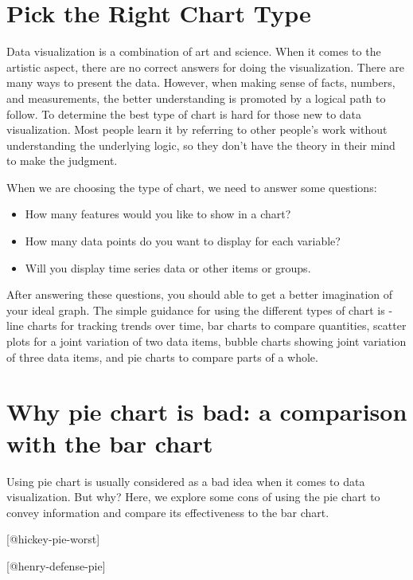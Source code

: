 \documentclass[]{book}
\providecommand{\tightlist}{%
  \setlength{\itemsep}{0pt}\setlength{\parskip}{0pt}}
\theoremstyle{definition}
\theoremstyle{definition}
\theoremstyle{definition}
\theoremstyle{remark}
\begin{document}
\section{Pick the Right Chart Type}\label{pick-the-right-chart-type}

Data visualization is a combination of art and science. When it comes to
the artistic aspect, there are no correct answers for doing the
visualization. There are many ways to present the data. However, when
making sense of facts, numbers, and measurements, the better
understanding is promoted by a logical path to follow. To determine the
best type of chart is hard for those new to data visualization. Most
people learn it by referring to other people's work without
understanding the underlying logic, so they don't have the theory in
their mind to make the judgment.

When we are choosing the type of chart, we need to answer some
questions:

\begin{itemize}
\tightlist
\item
  How many features would you like to show in a chart?
\item
  How many data points do you want to display for each variable?
\item
  Will you display time series data or other items or groups.
\end{itemize}

After answering these questions, you should able to get a better
imagination of your ideal graph. The simple guidance for using the
different types of chart is - line charts for tracking trends over time,
bar charts to compare quantities, scatter plots for a joint variation of
two data items, bubble charts showing joint variation of three data
items, and pie charts to compare parts of a whole.

\section{Why pie chart is bad: a comparison with the bar
chart}\label{why-pie-chart-is-bad-a-comparison-with-the-bar-chart}

Using pie chart is usually considered as a bad idea when it comes to
data visualization. But why? Here, we explore some cons of using the pie
chart to convey information and compare its effectiveness to the bar
chart.

{[}@hickey-pie-worst{]}

{[}@henry-defense-pie{]}
\end{document}
